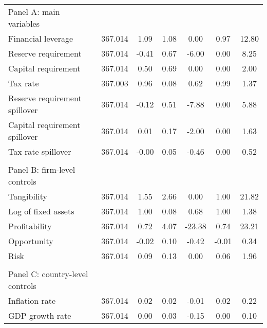 \begin{longtable}{lcccccc}
	Panel A: main variables         &      &        &        &        &       \\
\quad Financial leverage  &      367.014&        1.09&        1.08&        0.00&        0.97&       12.80\\
\quad Reserve requirement &      367.014&       -0.41&        0.67&       -6.00&        0.00&        8.25\\
\quad Capital requirement &      367.014&        0.50&        0.69&        0.00&        0.00&        2.00\\
\quad Tax rate            &      367.003&        0.96&        0.08&        0.62&        0.99&        1.37\\
\quad Reserve requirement spillover&      367.014&       -0.12&        0.51&       -7.88&        0.00&        5.88\\
\quad Capital requirement spillover&      367.014&        0.01&        0.17&       -2.00&        0.00&        1.63\\
\quad Tax rate spillover  &      367.014&       -0.00&        0.05&       -0.46&        0.00&        0.52\\
         &      &        &        &        &       \\
Panel B: firm-level controls         &      &        &        &        &       \\
\quad Tangibility         &      367.014&        1.55&        2.66&        0.00&        1.00&       21.82\\
\quad Log of fixed assets &      367.014&        1.00&        0.08&        0.68&        1.00&        1.38\\
\quad Profitability       &      367.014&        0.72&        4.07&      -23.38&        0.74&       23.21\\
\quad Opportunity         &      367.014&       -0.02&        0.10&       -0.42&       -0.01&        0.34\\
\quad Risk                &      367.014&        0.09&        0.13&        0.00&        0.06&        1.96\\
         &      &        &        &        &       \\
Panel C: country-level controls         &      &        &        &        &       \\
\quad Inflation rate      &      367.014&        0.02&        0.02&       -0.01&        0.02&        0.22\\
\quad GDP growth rate     &      367.014&        0.00&        0.03&       -0.15&        0.00&        0.10\\

\end{longtable}
